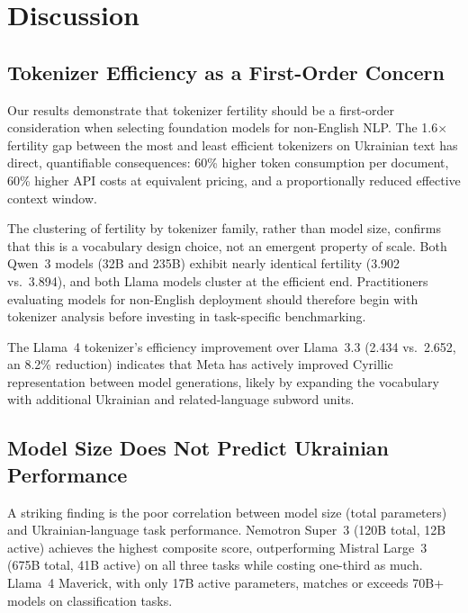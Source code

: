 \documentclass[11pt,a4paper]{article}
\begin{document}
\section{Discussion}

\subsection{Tokenizer Efficiency as a First-Order Concern}

Our results demonstrate that tokenizer fertility should be a first-order consideration when selecting foundation models for non-English NLP. The 1.6$\times$ fertility gap between the most and least efficient tokenizers on Ukrainian text has direct, quantifiable consequences: 60\% higher token consumption per document, 60\% higher API costs at equivalent pricing, and a proportionally reduced effective context window.

The clustering of fertility by tokenizer family, rather than model size, confirms that this is a vocabulary design choice, not an emergent property of scale. Both Qwen~3 models (32B and 235B) exhibit nearly identical fertility (3.902 vs.\ 3.894), and both Llama models cluster at the efficient end. Practitioners evaluating models for non-English deployment should therefore begin with tokenizer analysis before investing in task-specific benchmarking.

The Llama~4 tokenizer's efficiency improvement over Llama~3.3 (2.434 vs.\ 2.652, an 8.2\% reduction) indicates that Meta has actively improved Cyrillic representation between model generations, likely by expanding the vocabulary with additional Ukrainian and related-language subword units.

\subsection{Model Size Does Not Predict Ukrainian Performance}

A striking finding is the poor correlation between model size (total parameters) and Ukrainian-language task performance. Nemotron Super~3 (120B total, 12B active) achieves the highest composite score, outperforming Mistral Large~3 (675B total, 41B active) on all three tasks while costing one-third as much. Llama~4 Maverick, with only 17B active parameters, matches or exceeds 70B+ models on classification tasks.
\end{document}

